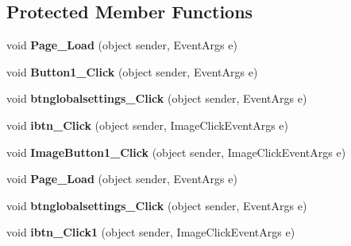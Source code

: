 \subsection*{Protected Member Functions}
\begin{DoxyCompactItemize}
\item 
\hypertarget{classusertrackmyhealth_a9d9d06e80e496922d11a23f4adbc6423}{void {\bfseries Page\-\_\-\-Load} (object sender, Event\-Args e)}\label{classusertrackmyhealth_a9d9d06e80e496922d11a23f4adbc6423}

\item 
\hypertarget{classusertrackmyhealth_a8a20b35ada54adfa9277a11520a36c67}{void {\bfseries Button1\-\_\-\-Click} (object sender, Event\-Args e)}\label{classusertrackmyhealth_a8a20b35ada54adfa9277a11520a36c67}

\item 
\hypertarget{classusertrackmyhealth_a8e35645b0450655e4e39fa181b7e9519}{void {\bfseries btnglobalsettings\-\_\-\-Click} (object sender, Event\-Args e)}\label{classusertrackmyhealth_a8e35645b0450655e4e39fa181b7e9519}

\item 
\hypertarget{classusertrackmyhealth_a43a839dc34bcab7c2f8e0f365990e222}{void {\bfseries ibtn\-\_\-\-Click} (object sender, Image\-Click\-Event\-Args e)}\label{classusertrackmyhealth_a43a839dc34bcab7c2f8e0f365990e222}

\item 
\hypertarget{classusertrackmyhealth_aff47432c6297139f01173ba082fcda14}{void {\bfseries Image\-Button1\-\_\-\-Click} (object sender, Image\-Click\-Event\-Args e)}\label{classusertrackmyhealth_aff47432c6297139f01173ba082fcda14}

\item 
\hypertarget{classusertrackmyhealth_a9d9d06e80e496922d11a23f4adbc6423}{void {\bfseries Page\-\_\-\-Load} (object sender, Event\-Args e)}\label{classusertrackmyhealth_a9d9d06e80e496922d11a23f4adbc6423}

\item 
\hypertarget{classusertrackmyhealth_a8e35645b0450655e4e39fa181b7e9519}{void {\bfseries btnglobalsettings\-\_\-\-Click} (object sender, Event\-Args e)}\label{classusertrackmyhealth_a8e35645b0450655e4e39fa181b7e9519}

\item 
\hypertarget{classusertrackmyhealth_a1fccd745e74228ab3119d1443de69dee}{void {\bfseries ibtn\-\_\-\-Click1} (object sender, Image\-Click\-Event\-Args e)}\label{classusertrackmyhealth_a1fccd745e74228ab3119d1443de69dee}

\end{DoxyCompactItemize}


